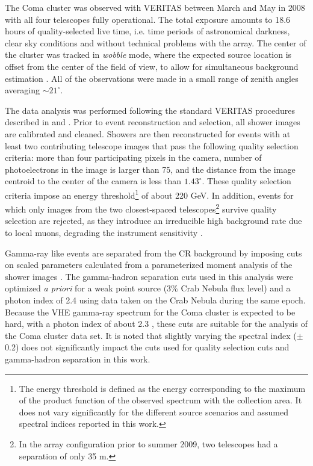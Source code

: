 \documentclass[12pt,manuscript]{aastex}
\begin{document}
The Coma cluster was observed with VERITAS between March and May in 2008 with all four telescopes
fully operational. The total exposure amounts to 18.6 hours of quality-selected live time, i.e.
time periods of astronomical darkness, clear sky conditions and without technical problems with the
array. The center of the cluster was tracked in \emph{wobble} mode, where the expected source
location is offset from the center of the field of view, to allow for simultaneous background
estimation \citep{article:Fomin_etal:1994}. All of the observations were made in a small range of
zenith angles averaging $\sim 21^{\circ}$.

The data analysis was performed following the standard VERITAS procedures described in
\citet{inproc:Cogan_etal:2007} and \citet{inproc:Daniel_etal:2007}. Prior to event reconstruction
and selection, all shower images are calibrated and cleaned. Showers are then reconstructed for
events with at least two contributing telescope images that pass the following quality selection
criteria: more than four participating pixels in the camera, number of photoelectrons in the image
is larger than 75, and the distance from the image centroid to the center of the camera is less
than $1.43^{\circ}$. These quality selection criteria impose an energy threshold\footnote{The energy
threshold is defined as the energy corresponding to the maximum of the product function of the
observed spectrum with the collection area. It does not vary significantly for the different source
scenarios and assumed spectral indices reported in this work.} of about 220 GeV. In addition,
events for which only images from the two closest-spaced telescopes\footnote{In the array
configuration prior to summer 2009, two telescopes  had a separation of only 35 m.} survive quality
selection are rejected, as they introduce an irreducible high background rate due to local muons, 
degrading the instrument sensitivity \citep{article:MaierKnapp:2007}.

Gamma-ray like events are separated from the CR background by imposing cuts on scaled parameters
\citep{article:Aharonian_etal:1997, article:Krawczynski_etal:2006} calculated from a parameterized
moment analysis of the shower images \citep{inproc:Hillas:1985}. The gamma-hadron separation cuts
used in this analysis were optimized {\em a priori} for a weak point source (3\% Crab Nebula flux
level) and a photon index of 2.4 using data taken on the Crab Nebula during the same epoch. Because
the VHE gamma-ray spectrum for the Coma cluster is expected to be hard, with a photon index of
about 2.3 \citep{article:PinzkePfrommer:2010}, these cuts are suitable for the analysis of the Coma
cluster data set. It is noted that slightly varying the spectral index ($\pm$ 0.2) does not
significantly impact the cuts used for quality selection cuts and gamma-hadron separation in this
work. 
\end{document}
